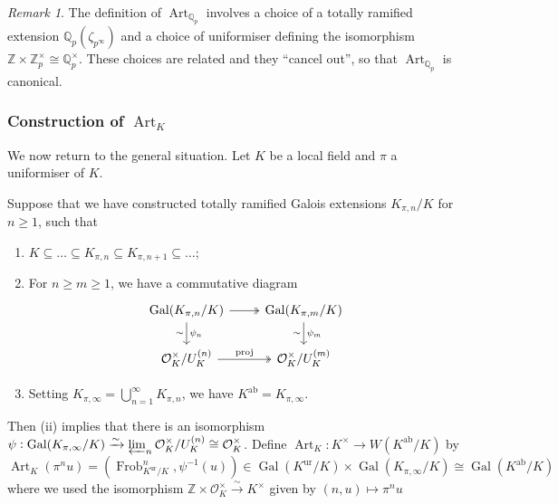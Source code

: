 \documentclass[11pt]{article}
\theoremstyle{definition}
\theoremstyle{plain}
\theoremstyle{remark}
\newtheorem*{remark}{Remark}
\DeclareMathOperator{\Gal}{Gal}
\DeclareMathOperator{\proj}{proj}
\DeclareMathOperator{\Frob}{Frob}
\DeclareMathOperator{\Art}{Art}
\newcommand{\ZZ}{\mathbb{Z}}
\newcommand{\QQ}{\mathbb{Q}}
\newcommand{\cO}{\mathcal{O}}
\newcommand{\ab}{\mathrm{ab}}
\newcommand{\ur}{\mathrm{ur}}
\begin{document}
\begin{remark}
    The definition of $\Art_{\QQ_p}$ involves a choice of a totally ramified extension $\QQ_p(\zeta_{p^\infty})$ and a choice of uniformiser defining the isomorphism $\ZZ \times \ZZ_p^\times \cong \QQ_p^\times$. These choices are related and they ``cancel out'', so that $\Art_{\QQ_p}$ is canonical.
\end{remark}

\subsubsection*{Construction of $\Art_K$}
We now return to the general situation. Let $K$ be a local field and $\pi$ a uniformiser of $K$.

Suppose that we have constructed totally ramified Galois extensions $K_{\pi, n}/K$ for $n \ge 1$, such that
\begin{enumerate}
    \item $K \subseteq \ldots \subseteq K_{\pi, n} \subseteq K_{\pi, n+1} \subseteq \ldots$;

    \item For $n \ge m \ge 1$, we have a commutative diagram
        \begin{equation*}
        \begin{tikzcd}
            \Gal(K_{\pi,n}/K) \arrow[r, twoheadrightarrow] \arrow[d, "\psi_n", "\sim"'] & \Gal(K_{\pi,m}/K) \arrow[d, "\psi_m", "\sim"']\\
            \cO_K^\times / U_K^{(n)} \arrow[r, twoheadrightarrow, "\proj"] & \cO_K^\times / U_K^{(m)}
        \end{tikzcd}
        \end{equation*}

    \item Setting $K_{\pi, \infty} = \bigcup_{n=1}^\infty K_{\pi,n}$, we have $K^\ab = K_{\pi, \infty}$.
\end{enumerate}
Then (ii) implies that there is an isomorphism $\psi : \Gal(K_{\pi,\infty}/K) \xrightarrow{\sim} \varprojlim_{n} \cO_K^\times / U_K^{(n)} \cong \cO_K^\times$. Define $\Art_K : K^\times \to W(K^\ab / K)$ by
\begin{equation*}
    \Art_K(\pi^n u) = (\Frob_{K^\ur/K}^n, \psi^{-1}(u)) \in \Gal(K^\ur / K) \times \Gal(K_{\pi,\infty}/K) \cong \Gal(K^\ab/K)
\end{equation*}
where we used the isomorphism $\ZZ \times \cO_K^\times \xrightarrow{\sim} K^\times$ given by $(n, u) \mapsto \pi^n u$
\end{document}
